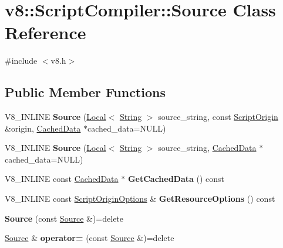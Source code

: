 \hypertarget{classv8_1_1ScriptCompiler_1_1Source}{}\section{v8\+:\+:Script\+Compiler\+:\+:Source Class Reference}
\label{classv8_1_1ScriptCompiler_1_1Source}


{\ttfamily \#include $<$v8.\+h$>$}

\subsection*{Public Member Functions}
\begin{DoxyCompactItemize}
\item 
\mbox{\label{classv8_1_1ScriptCompiler_1_1Source_ae71a5fe18124d71f9acfcc872310d586}} 
V8\+\_\+\+I\+N\+L\+I\+NE {\bfseries Source} (\mbox{\hyperlink{classv8_1_1Local}{Local}}$<$ \mbox{\hyperlink{classv8_1_1String}{String}} $>$ source\+\_\+string, const \mbox{\hyperlink{classv8_1_1ScriptOrigin}{Script\+Origin}} \&origin, \mbox{\hyperlink{structv8_1_1ScriptCompiler_1_1CachedData}{Cached\+Data}} $\ast$cached\+\_\+data=N\+U\+LL)
\item 
\mbox{\label{classv8_1_1ScriptCompiler_1_1Source_ad46e9d298cf3199c3a570182a680449d}} 
V8\+\_\+\+I\+N\+L\+I\+NE {\bfseries Source} (\mbox{\hyperlink{classv8_1_1Local}{Local}}$<$ \mbox{\hyperlink{classv8_1_1String}{String}} $>$ source\+\_\+string, \mbox{\hyperlink{structv8_1_1ScriptCompiler_1_1CachedData}{Cached\+Data}} $\ast$cached\+\_\+data=N\+U\+LL)
\item 
\mbox{\label{classv8_1_1ScriptCompiler_1_1Source_aa3c0706b728864348e2ffed3d8171e13}} 
V8\+\_\+\+I\+N\+L\+I\+NE const \mbox{\hyperlink{structv8_1_1ScriptCompiler_1_1CachedData}{Cached\+Data}} $\ast$ {\bfseries Get\+Cached\+Data} () const
\item 
\mbox{\label{classv8_1_1ScriptCompiler_1_1Source_add86f8a29146eb28f6f9609e946f354b}} 
V8\+\_\+\+I\+N\+L\+I\+NE const \mbox{\hyperlink{classv8_1_1ScriptOriginOptions}{Script\+Origin\+Options}} \& {\bfseries Get\+Resource\+Options} () const
\item 
\mbox{\label{classv8_1_1ScriptCompiler_1_1Source_a3dd172320a0954c69f8f609a7ea34d5e}} 
{\bfseries Source} (const \mbox{\hyperlink{classv8_1_1ScriptCompiler_1_1Source}{Source}} \&)=delete
\item 
\mbox{\label{classv8_1_1ScriptCompiler_1_1Source_ad9bd0550f7b3a33a8ef9e739eccdcb3a}} 
\mbox{\hyperlink{classv8_1_1ScriptCompiler_1_1Source}{Source}} \& {\bfseries operator=} (const \mbox{\hyperlink{classv8_1_1ScriptCompiler_1_1Source}{Source}} \&)=delete
\end{DoxyCompactItemize}
